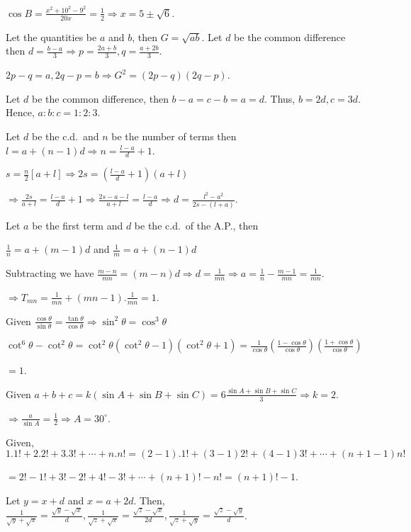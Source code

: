   $\cos B = \frac{x^2 + 10^2 - 9^2}{20x} = \frac{1}{2}\Rightarrow x = 5\pm\sqrt{6}$.
\item Let the quantities be $a$ and $b$, then $G = \sqrt{ab}$. Let $d$ be the common difference then $d
  = \frac{b - a}{3}\Rightarrow p = \frac{2a + b}{3}, q = \frac{a + 2b}{3}$.

  $2p - q = a, 2q - p = b \Rightarrow G^2 = (2p - q)(2q - p)$.
\item Let $d$ be the common difference, then $b - a = c - b = a = d$. Thus, $b = 2d, c = 3d$. Hence, $a:b:c
  = 1:2:3$.
\item Let $d$ be the c.d.\ and $n$ be the number of terms then $l = a + (n - 1)d \Rightarrow n = \frac{l -
  a}{d} + 1$.

  $s = \frac{n}{2}[a + l] \Rightarrow 2s = \left(\frac{l - a}{d} + 1\right)(a + l)$

  $\Rightarrow \frac{2s}{a + l} = \frac{l - a}{d} + 1 \Rightarrow \frac{2s - a - l}{a + l} = \frac{l -
  a}{d} \Rightarrow d = \frac{l^2 - a^2}{2s - (l + a)}$.
\item Let $a$ be the first term and $d$ be the c.d.\ of the A.P., then

  $\frac{1}{n} = a + (m - 1)d$ and $\frac{1}{m} = a + (n - 1)d$

  Subtracting we have $\frac{m - n}{mn} = (m - n)d \Rightarrow d = \frac{1}{mn} \Rightarrow a = \frac{1}{n}
  - \frac{m - 1}{mn} = \frac{1}{mn}$.

  $\Rightarrow T_{mn} = \frac{1}{mn} + (mn - 1).\frac{1}{mn} = 1$.
\item Given $\frac{\cos\theta}{\sin\theta} = \frac{\tan\theta}{\cos\theta} \Rightarrow \sin^2\theta
  = \cos^3\theta$

  $\cot^6\theta - \cot^2\theta = \cot^2\theta(\cot^2\theta - 1)(\cot^2\theta + 1)
  = \frac{1}{\cos\theta}\left(\frac{1 - \cos\theta}{\cos\theta}\right)\left(\frac{1
    + \cos\theta}{\cos\theta}\right)$

  $= 1$.
\item Given $a + b + c = k(\sin A + \sin B + \sin C) = 6\frac{\sin A + \sin B + \sin C}{3} \Rightarrow k =
  2$.

  $\Rightarrow \frac{a}{\sin A} = \frac{1}{2} \Rightarrow A = 30^\circ$.
\item Given, $1.1! + 2.2! + 3.3! + \cdots + n.n! = (2 - 1).1! + (3 - 1)2! + (4 - 1)3! + \cdots + (n + 1 -
  1)n!$

  $= 2! - 1! + 3! - 2! + 4! - 3! + \cdots + (n + 1)! - n! = (n + 1)! - 1$.
\item Let $y = x + d$ and $x = a + 2d$. Then, $\frac{1}{\sqrt{y} + \sqrt{x}} = \frac{\sqrt{y}
  - \sqrt{x}}{d}, \frac{1}{\sqrt{z} + \sqrt{x}} = \frac{\sqrt{z} - \sqrt{x}}{2d}, \frac{1}{\sqrt{z}
  + \sqrt{y}} = \frac{\sqrt{z} - \sqrt{y}}{d}$.

